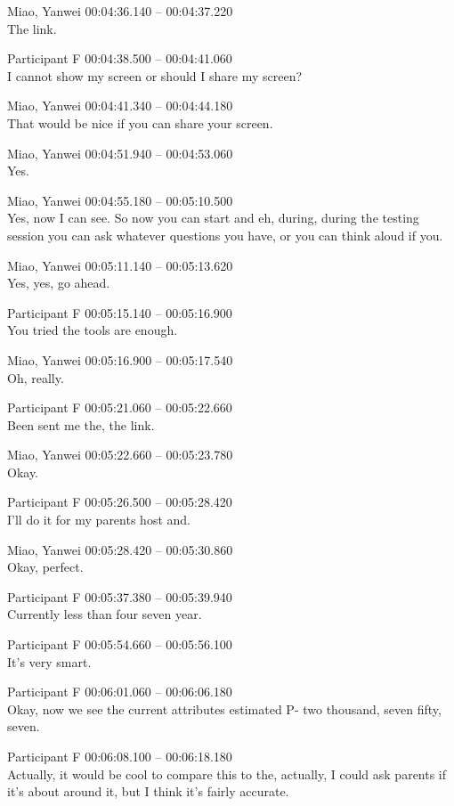 {Miao, Yanwei 00:04:36.140 -- 00:04:37.220 \\
The link.

Participant F 00:04:38.500 -- 00:04:41.060 \\
I cannot show my screen or should I share my screen?

Miao, Yanwei 00:04:41.340 -- 00:04:44.180 \\
That would be nice if you can share your screen.

Miao, Yanwei 00:04:51.940 -- 00:04:53.060 \\
Yes.

Miao, Yanwei 00:04:55.180 -- 00:05:10.500 \\
Yes, now I can see. So now you can start and eh, during, during the testing session you can ask whatever questions you have, or you can think aloud if you.

Miao, Yanwei 00:05:11.140 -- 00:05:13.620 \\
Yes, yes, go ahead.

Participant F 00:05:15.140 -- 00:05:16.900 \\
You tried the tools are enough.

Miao, Yanwei 00:05:16.900 -- 00:05:17.540 \\
Oh, really.

Participant F 00:05:21.060 -- 00:05:22.660 \\
Been sent me the, the link.

Miao, Yanwei 00:05:22.660 -- 00:05:23.780 \\
Okay.

Participant F 00:05:26.500 -- 00:05:28.420 \\
I'll do it for my parents host and.

Miao, Yanwei 00:05:28.420 -- 00:05:30.860 \\
Okay, perfect.

Participant F 00:05:37.380 -- 00:05:39.940 \\
Currently less than four seven year.

Participant F 00:05:54.660 -- 00:05:56.100 \\
It's very smart.

Participant F 00:06:01.060 -- 00:06:06.180 \\
Okay, now we see the current attributes estimated P- two thousand, seven fifty, seven.

Participant F 00:06:08.100 -- 00:06:18.180 \\
Actually, it would be cool to compare this to the, actually, I could ask parents if it's about around it, but I think it's fairly accurate.

}
